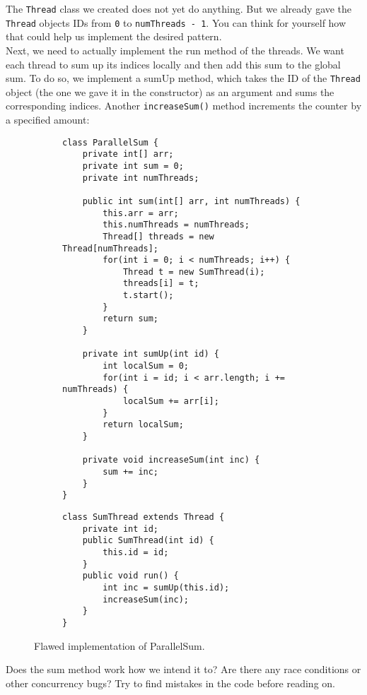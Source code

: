 \documentclass[main.tex]{subfiles}
\begin{document}
The \texttt{Thread} class we created does not yet do anything. But we already gave the \texttt{Thread} objects IDs from \texttt{0} to \texttt{numThreads - 1}. You can think for yourself how that could help us implement the desired pattern.\\[3mm]
Next, we need to actually implement the run method of the threads. We want each thread to sum up its indices locally and then add this sum to the global sum. To do so, we implement a sumUp method, which takes the ID of the \texttt{Thread} object (the one we gave it in the constructor) as an argument and sums the corresponding indices. Another \texttt{increaseSum()} method increments the counter by a specified amount:

\begin{figure}[H]
    \begin{subfigure}[t]{.62\textwidth}
        \begin{verbatim}
class ParallelSum {
    private int[] arr;
    private int sum = 0;
    private int numThreads;

    public int sum(int[] arr, int numThreads) {
        this.arr = arr;
        this.numThreads = numThreads;
        Thread[] threads = new Thread[numThreads];
        for(int i = 0; i < numThreads; i++) {
            Thread t = new SumThread(i);
            threads[i] = t;
            t.start();
        }
        return sum;
    }

    private int sumUp(int id) {
        int localSum = 0;
        for(int i = id; i < arr.length; i += numThreads) {
            localSum += arr[i];
        }
        return localSum;
    }

    private void increaseSum(int inc) {
        sum += inc;
    }
}
        \end{verbatim}
    \end{subfigure}%
    \begin{subfigure}[t]{.62\textwidth}
        \begin{verbatim}
class SumThread extends Thread {
    private int id;
    public SumThread(int id) {
        this.id = id;
    }
    public void run() {
        int inc = sumUp(this.id);
        increaseSum(inc);
    }
}
        \end{verbatim}
    \end{subfigure}
    \caption{Flawed implementation of ParallelSum.}
\end{figure}
Does the sum method work how we intend it to? Are there any race conditions or other concurrency bugs? Try to find mistakes in the code before reading on.\\[3mm]
\end{document}
